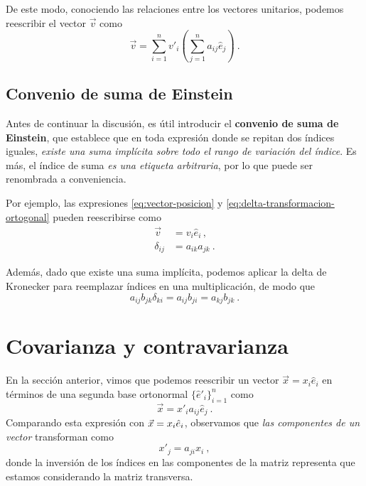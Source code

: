 De este modo, conociendo las relaciones entre los vectores unitarios, podemos reescribir el vector $\vec{v}$ como
\begin{equation}
    \vec{v} = \sum_{i=1}^n v'_i \left( \sum_{j=1}^n a_{ij} \hat{e}_j \right) \ .
\end{equation}

\subsection{Convenio de suma de Einstein}

Antes de continuar la discusión, es útil introducir el  \textbf{convenio de suma de Einstein}, que establece que en toda expresión donde se repitan dos índices iguales, \emph{existe una suma implícita sobre todo el rango de variación del índice}. Es más, el índice de suma \emph{es una etiqueta arbitraria}, por lo que puede ser renombrada a conveniencia.

Por ejemplo, las expresiones \eqref{eq:vector-posicion} y \eqref{eq:delta-transformacion-ortogonal} pueden reescribirse como
\begin{align}
    \vec{v} & = v_i \hat{e}_i \, , \\
    \delta_{ij} & = a_{ik} a_{jk} \ .
\end{align}

Además, dado que existe una suma implícita, podemos aplicar la delta de Kronecker para reemplazar índices en una multiplicación, de modo que
\begin{equation}
    a_{ij} b_{jk} \delta_{ki} = a_{ij} b_{ji} = a_{kj} b_{jk} \ .
\end{equation}

\section{Covarianza y contravarianza}

En la sección anterior, vimos que podemos reescribir un vector $\vec{x} = x_i \hat{e}_i$ en términos de una segunda base ortonormal $\{\hat{e}'_i\}_{i=1}^n$ como
\begin{equation} \label{eq:transformacion-vector}
    \vec{x} = x'_i a_{ij} \hat{e}_j \ .
\end{equation}
Comparando esta expresión con $\vec{x} = x_i \hat{e}_i$, observamos que \emph{las componentes de un vector} transforman como
\begin{equation} \label{eq:transformacion-componentes}
    x'_j = a_{ji} x_i \ , 
\end{equation}
donde la inversión de los índices en las componentes de la matriz representa que estamos considerando la matriz transversa.

